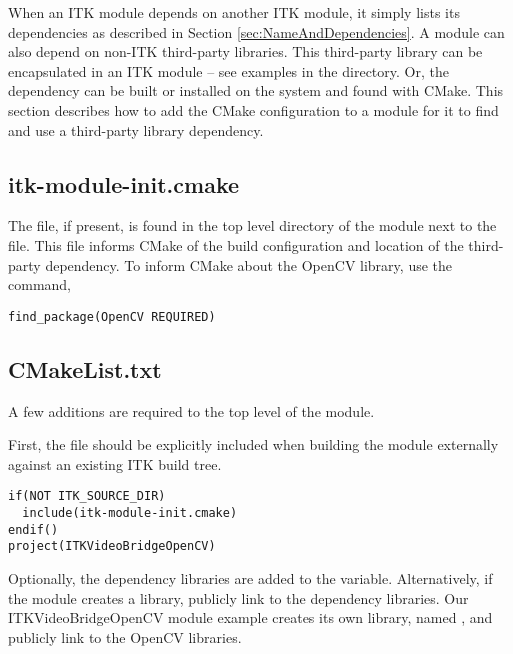 When an ITK module depends on another ITK module, it simply lists its
dependencies as described in Section \ref{sec:NameAndDependencies}. A module
can also depend on non-ITK third-party libraries. This third-party library can
be encapsulated in an ITK module -- see examples in the
 directory. Or, the dependency can be built or
installed on the system and found with CMake. This section describes how to
add the CMake configuration to a module for it to find and use a third-party
library dependency.


\subsection{itk-module-init.cmake}

The  file, if present, is found in the top level
directory of the module next to the  file. This file
informs CMake of the build configuration and location of the third-party
dependency. To inform CMake about the OpenCV library, use the
 command,

\begin{verbatim}
find_package(OpenCV REQUIRED)
\end{verbatim}


\subsection{CMakeList.txt}

A few additions are required to the top level  of the
module.

First, the  file should be explicitly included
when building the module externally against an existing ITK build tree.

\begin{verbatim}
if(NOT ITK_SOURCE_DIR)
  include(itk-module-init.cmake)
endif()
project(ITKVideoBridgeOpenCV)
\end{verbatim}

Optionally, the dependency libraries are added to the
 variable. Alternatively, if the module creates
a library, publicly link to the dependency libraries. Our
ITKVideoBridgeOpenCV module example creates its own library, named
, and publicly link to the OpenCV libraries.

